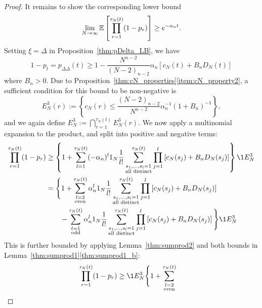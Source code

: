 \begin{proof}
It remains to show the corresponding lower bound
\begin{equation*}
    \lim_{N\to\infty} \mathbb{E}\left[ \prod_{r=1}^{\tau_N(t)} (1-p_r) \right] 
\geq e^{-\alpha_n t} .
\end{equation*}
Setting $\xi=\Delta$ in Proposition~\ref{thm:pDelta_LB}, we have
\begin{equation}\label{eq:pDeltaDelta_LB}
1-p_t
= p_{\Delta\Delta}(t) \geq 1 - \frac{N^{n-2}}{(N-2)_{n-2}} \alpha_n 
    [ c_N(t) + B_n D_N(t) ] 
\end{equation}
where $B_n >0$.
Due to Proposition~\ref{thm:cN_properties}\eqref{item:cN_property2}, a sufficient condition for this bound to be non-negative is
\begin{equation}\label{eq:defn_E3}
E_N^3(r)
:= \left\{ c_N(r) \leq \frac{(N-2)_{n-2}}{N^{n-2}} 
        \alpha_n^{-1} (1+B_n)^{-1} \right\} ,
\end{equation}
and we again define $E_N^3 := \bigcap_{r=1}^{\tau_N(t)} E_N^3(r)$.
We now apply a multinomial expansion to the product, and split into positive and negative terms:
\begin{align*}
\prod_{r=1}^{\tau_N(t)} (1-p_r)
&\geq \left\{ 1 + \sum_{l=1}^{\tau_N(t)} (-\alpha_n)^l \ON 
        \frac{1}{l!} \sum_{\substack{ s_1, \dots, s_l =1 \\ \text{all distinct} }}^{\tau_N(t)}
        \prod_{j=1}^l
        \left[ c_N(s_j) + B_n D_N(s_j) \right] \right\} \1{E_N^3} \\
&= \Bigg\{ 1 + \sum_{\substack{l=2 \\ \text{even} }}^{\tau_N(t)} 
        \alpha_n^l \ON \frac{1}{l!} 
        \sum_{\substack{ s_1, \dots, s_l =1 \\ \text{all distinct} }}^{\tau_N(t)}
        \prod_{j=1}^l
        \left[ c_N(s_j) + B_n D_N(s_j) \right] \\
    &\qquad- \sum_{\substack{l=1 \\ \text{odd} }}^{\tau_N(t)} 
        \alpha_n^l \ON \frac{1}{l!}
        \sum_{\substack{ s_1, \dots, s_l =1 \\ \text{all distinct} }}^{\tau_N(t)}
        \prod_{j=1}^l
        \left[ c_N(s_j) + B_n D_N(s_j) \right] \Bigg\} \1{E_N^3}
\end{align*}
This is further bounded by applying Lemma~\ref{thm:sumprod2} and both bounds in Lemma~\ref{thm:sumprod1}\ref{thm:sumprod1_b}:
\begin{align*}
\prod_{r=1}^{\tau_N(t)} (1-p_r)
&\geq \1{E_N^3} \Bigg\{ 1 + 
        \sum_{\substack{l=2 \\ \text{even} }}^{\tau_N(t)} 

\end{align*}
\end{proof}
